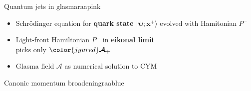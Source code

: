 \documentclass[aspectratio=169,11pt,usenames,dvipsnames]{beamer}
\begin{document}
\begin{frame}[noframenumbering]
\begin{center}
\begin{columns}[onlytextwidth,t]
            \begin{center}
                \begin{custombox2}{\normalsize Quantum jets in glasma}{raapink}
                    \small
                    \begin{varwidth}{0.92\textwidth}
                    \begin{itemize}\itemsep0em 
                        \itemsep0em
                        \footnotesize
                        \item Schr\"{o}dinger equation for {\bfseries\color{raapink} quark state $\boldsymbol{|\psi; x^+\rangle}$} evolved with Hamitonian $P^-$
                        \item Light-front Hamiltonian $P^-$ in {\bfseries\color{jyured}eikonal limit}\\ picks only
                        ${\color{jyured}\boldsymbol{\mathcal{A}_+}}$
                        \item Glasma field $\mathcal{A}$ as numerical solution to CYM 
                    \end{itemize}
                    \end{varwidth}
                \end{custombox2}
                \begin{custombox2}{\normalsize Canonic momentum broadening}{raablue}
                    \small
                    \begin{varwidth}{0.8\textwidth}

\end{varwidth}
\end{custombox2}
\end{center}
\end{columns}
\end{center}
\end{frame}
\end{document}
